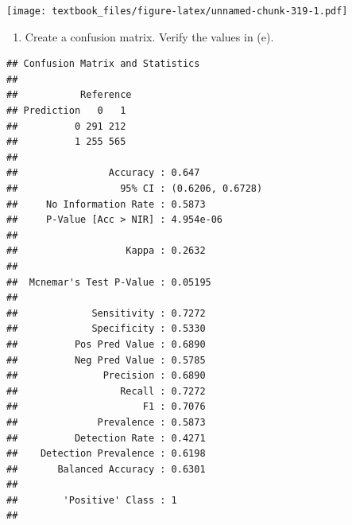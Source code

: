 \documentclass[
  11pt,
]{book}
\newenvironment{Shaded}{\begin{snugshade}}{\end{snugshade}}
\newcommand{\AttributeTok}[1]{\textcolor[rgb]{0.77,0.63,0.00}{#1}}
\newcommand{\FunctionTok}[1]{\textcolor[rgb]{0.00,0.00,0.00}{#1}}
\newcommand{\NormalTok}[1]{#1}
\newcommand{\SpecialCharTok}[1]{\textcolor[rgb]{0.00,0.00,0.00}{#1}}
\newcommand{\StringTok}[1]{\textcolor[rgb]{0.31,0.60,0.02}{#1}}
\providecommand{\tightlist}{%
  \setlength{\itemsep}{0pt}\setlength{\parskip}{0pt}}
\theoremstyle{definition}
\theoremstyle{definition}
\theoremstyle{definition}
\theoremstyle{definition}
\theoremstyle{remark}
\begin{document}
\texttt{[image: textbook\_files/figure-latex/unnamed-chunk-319-1.pdf]}

\newpage

\begin{enumerate}
\def\labelenumi{(\alph{enumi})}
\setcounter{enumi}{6}
\tightlist
\item
  Create a confusion matrix. Verify the values in (e).
\end{enumerate}

\begin{Shaded}
\end{Shaded}

\begin{verbatim}
## Confusion Matrix and Statistics
## 
##           Reference
## Prediction   0   1
##          0 291 212
##          1 255 565
##                                           
##                Accuracy : 0.647           
##                  95% CI : (0.6206, 0.6728)
##     No Information Rate : 0.5873          
##     P-Value [Acc > NIR] : 4.954e-06       
##                                           
##                   Kappa : 0.2632          
##                                           
##  Mcnemar's Test P-Value : 0.05195         
##                                           
##             Sensitivity : 0.7272          
##             Specificity : 0.5330          
##          Pos Pred Value : 0.6890          
##          Neg Pred Value : 0.5785          
##               Precision : 0.6890          
##                  Recall : 0.7272          
##                      F1 : 0.7076          
##              Prevalence : 0.5873          
##          Detection Rate : 0.4271          
##    Detection Prevalence : 0.6198          
##       Balanced Accuracy : 0.6301          
##                                           
##        'Positive' Class : 1               
## 
\end{verbatim}

\newpage
\end{document}
